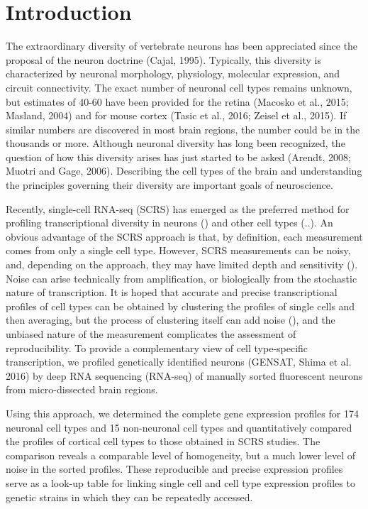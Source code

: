\section*{Introduction}


The extraordinary diversity of vertebrate neurons has been appreciated since the proposal of the neuron doctrine (Cajal, 1995). Typically, this diversity is characterized by neuronal morphology, physiology, molecular expression, and circuit connectivity. The exact number of neuronal cell types remains unknown, but estimates of 40-60 have been provided for the retina (Macosko et al., 2015; Masland, 2004) and for mouse cortex (Tasic et al., 2016; Zeisel et al., 2015). If similar numbers are discovered in most brain regions, the number could be in the thousands or more. Although neuronal diversity has long been recognized, the question of how this diversity arises has just started to be asked (Arendt, 2008; Muotri and Gage, 2006). Describing the cell types of the brain and understanding the principles governing their diversity are important goals of neuroscience.

Recently, single-cell RNA-seq (SCRS) has emerged as the preferred method for profiling transcriptional diversity in neurons () and other cell types (..). An obvious advantage of the SCRS approach is that, by definition, each measurement comes from only a single cell type. However, SCRS measurements can be noisy, and, depending on the approach, they may have limited depth and sensitivity (). Noise can arise technically from amplification, or biologically from the stochastic nature of transcription. It is hoped that accurate and precise transcriptional profiles of cell types can be obtained by clustering the profiles of single cells and then averaging, but the process of clustering itself can add noise (), and the unbiased nature of the measurement complicates the assessment of reproducibility. To provide a complementary view of cell type-specific transcription, we profiled genetically identified neurons (GENSAT, Shima et al. 2016) by deep RNA sequencing (RNA-seq) of manually sorted fluorescent neurons from micro-dissected brain regions.  

Using this approach, we determined the complete gene expression profiles for 174 neuronal cell types and 15 non-neuronal cell types and quantitatively compared the profiles of cortical cell types to those obtained in SCRS studies. The comparison reveals a comparable level of homogeneity, but a much lower level of noise in the sorted profiles. These reproducible and precise expression profiles serve as a look-up table for linking single cell and cell type expression profiles to genetic strains in which they can be repeatedly accessed. 


